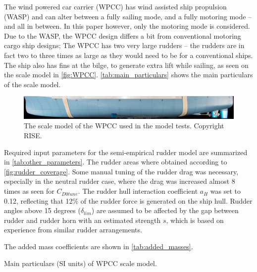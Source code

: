 The wind powered car carrier (WPCC) has wind assisted ship propulsion (WASP) and can alter between a fully sailing mode, and a fully motoring mode -- and all in between. 
In this paper however, only the motoring mode is considered. Due to the WASP, the WPCC design differs a bit from conventional motoring cargo ship designs; The WPCC has two very large rudders -- the rudders are in fact two to three times as large as they would need to be for a conventional ships. The ship also has fins at the bilge, to generate extra lift while sailing, as seen on the scale model in \autoref{fig:WPCC}. 
\autoref{tab:main_particulars} shows the main particulars of the scale model. 
\begin{figure}[h]
    \centering
    \includegraphics[width=\columnwidth]{figures/5m2.jpg}
    \caption{The scale model of the WPCC used in the model tests. Copyright RISE.}
    \label{fig:WPCC}
\end{figure}

Required input parameters for the semi-empirical rudder model are summarized in \autoref{tab:other_parameters}.
The rudder areas where obtained according to \autoref{fig:rudder_coverage}.   
Some manual tuning of the rudder drag was necessary, especially in the neutral rudder case, where the drag was increased almost 8 times as seen for $C_{D0tune}$. The rudder hull interaction coefficient $a_H$ was set to 0.12, reflecting that 12\% of the rudder force is generated on the ship hull.
Rudder angles above 15 degrees ($\delta_{lim}$) are assumed to be affected by the gap between rudder and rudder horn with an estimated strength $s$, which is based on experience from similar rudder arrangements.

The added mass coefficients are shown in \autoref{tab:added_masses}.
\begin{table}[h]
    \centering
    \caption{Main particulars (SI units) of WPCC scale model.}
    \label{tab:main_particulars}
\end{table}